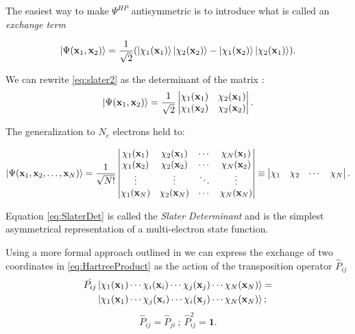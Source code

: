 \documentclass[a4paper,12pt]{article}
\begin{document}
The easiest way to make $\Psi^{HP}$ antisymmetric is to introduce what is called an \textit{exchange term}

\begin{equation}\label{eq:slater2}
	\ket{\Psi(\mathbf{x}_1,\mathbf{x}_2)} = \frac{1}{\sqrt{2}} (\ket{\chi_1(\mathbf{x}_1)} \ket{ \chi_2(\mathbf{x}_2)} - \ket{\chi_1(\mathbf{x}_2)} \ket{\chi_2(\mathbf{x}_1)} ).
\end{equation}

We can rewrite \eqref{eq:slater2} as the determinant of the matrix :
\begin{equation}
\ket{\Psi(\mathbf{x}_1,\mathbf{x}_2)} = \frac{1}{\sqrt{2}}
\begin{vmatrix}
\chi_1(\mathbf{x}_1) & \chi_2(\mathbf{x}_1) \\
\chi_1(\mathbf{x}_2) & \chi_2(\mathbf{x}_2) 
\end{vmatrix}.
\end{equation}

The generalization to $N_e$ electrons held to:

\begin{equation}\label{eq:SlaterDet}
\ket{\Psi(\mathbf{x}_1, \mathbf{x}_2, \ldots, \mathbf{x}_N)} =
\frac{1}{\sqrt{N!}}
\left|
	\begin{matrix} 
   		\chi_1(\mathbf{x}_1) & \chi_2(\mathbf{x}_1) & \cdots & \chi_N(\mathbf{x}_1) \\
        \chi_1(\mathbf{x}_2) & \chi_2(\mathbf{x}_2) & \cdots & \chi_N(\mathbf{x}_2) \\
		\vdots & \vdots & \ddots & \vdots \\
        \chi_1(\mathbf{x}_N) & \chi_2(\mathbf{x}_N) & \cdots & \chi_N(\mathbf{x}_N)
    \end{matrix} 
	\right|\equiv \left| 
	\begin{matrix}
		   \chi _1 & \chi _2 & \cdots  & \chi _N  \\
	\end{matrix}
   \right|.
\end{equation}

Equation \eqref{eq:SlaterDet} is called the \textit{Slater Determinant} and is the simplest asymmetrical representation of a multi-electron state function.

Using a more formal approach outlined in \cite[p.357-362]{Sakurai} we can express the exchange of two coordinates in \eqref{eq:HartreeProduct} as the action of the transposition operator $\hat{P}_{ij}$ 
\begin{align} \label{eq:transpositionOp}
	\begin{split}
		\hat{P_{ij}} & \ket{\chi_1(\mathbf{x}_1)   \cdots  \chi_i(\mathbf{x}_i)  \cdots  \chi_j(\mathbf{x}_j)  \cdots   \chi_N(\mathbf{x}_N)} =   \\ 
		& \ket{\chi_1(\mathbf{x}_1)   \cdots  \chi_j(\mathbf{x}_i)  \cdots  \chi_i(\mathbf{x}_j) \cdots  \chi_N(\mathbf{x}_N)} ;
	\end{split}
\end{align}
\begin{equation*}
	\hat{P}_{ij} = \hat{P}_{ji} ~;~
	\hat{P}_{ij}^2 = \mathbf{1}.
\end{equation*}
\end{document}
